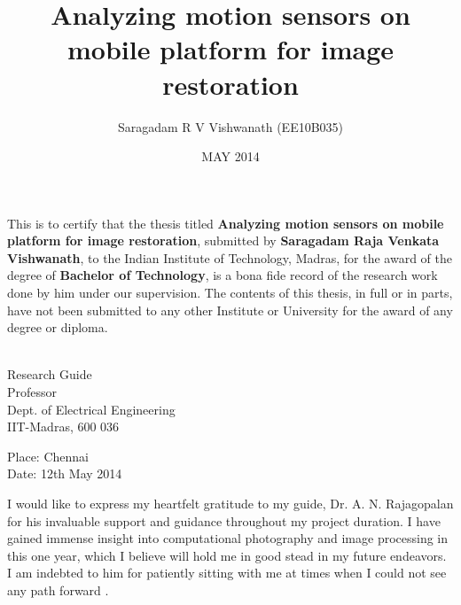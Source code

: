 \documentclass[BTech]{iitmdiss}
\begin{document}
\title{Analyzing motion sensors on mobile platform for image restoration}
\author{Saragadam R V Vishwanath (EE10B035)}
\date{MAY 2014}
\maketitle
\pagebreak

\certificate

\vspace*{0.5in}

\noindent This is to certify that the thesis titled {\bf Analyzing
 motion sensors on mobile platform for image restoration}, submitted by
  {\bf Saragadam Raja Venkata Vishwanath}, 
  to the Indian Institute of Technology, Madras, for
the award of the degree of {\bf Bachelor of Technology}, is a bona fide
record of the research work done by him under our supervision.  The
contents of this thesis, in full or in parts, have not been submitted
to any other Institute or University for the award of any degree or
diploma.

\vspace*{1.5in}

\begin{singlespacing}
\hspace*{-0.25in}
\parbox{2.5in}{
 \\
\noindent Research Guide \\ 
\noindent Professor \\
\noindent Dept. of Electrical Engineering\\
\noindent IIT-Madras, 600 036 \\
} 
\hspace*{1.0in} 
\end{singlespacing}
\vspace*{0.25in}
\noindent Place: Chennai\\
Date: 12th May 2014

\pagebreak

\acknowledgements

I would like to express my heartfelt gratitude to my guide, 
Dr. A. N. Rajagopalan for his invaluable support and guidance throughout
my project duration. I have gained immense insight into computational
photography and image processing in this one year, which I believe will 
hold me in good stead in my future endeavors. I am indebted to him for
patiently sitting with me at times when I could not see any path forward
. 
\end{document}
